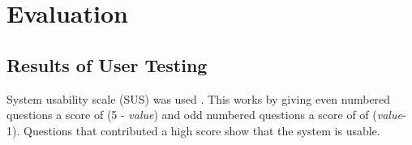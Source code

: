 \section{Evaluation}

\subsection{Results of User Testing}

System usability scale (SUS) was used \cite{SUS}. This works by giving even numbered questions a score of (5 - \emph{value}) and odd numbered questions a score of of (\emph{value}-1). Questions that contributed a high score show that the system is usable. 

  
